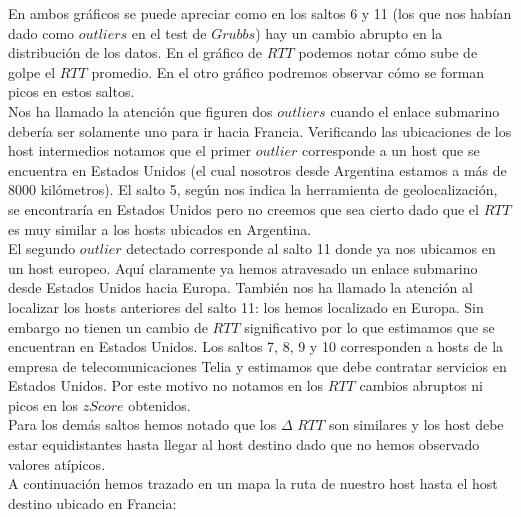 En ambos gráficos se puede apreciar como en los saltos 6 y 11 (los que nos habían dado como $outliers$ en el test de $Grubbs$) hay un cambio abrupto 
en la distribución de los datos. En el gráfico de $RTT$ podemos notar cómo sube de golpe el $RTT$ promedio. En el otro gráfico podremos observar cómo 
se forman picos en estos saltos.\\

Nos ha llamado la atención que figuren dos $outliers$ cuando el enlace submarino debería ser solamente uno para ir hacia Francia. 
Verificando las ubicaciones de los host intermedios notamos que el primer $outlier$ corresponde a un host que se encuentra en Estados Unidos 
(el cual nosotros desde Argentina estamos a más de 8000 kilómetros). El salto 5, según nos indica la herramienta de geolocalización, se encontraría
en Estados Unidos pero no creemos que sea cierto dado que el $RTT$ es muy similar a los hosts ubicados en Argentina.\\

El segundo $outlier$ detectado corresponde al salto 11 donde ya nos ubicamos en un host europeo. Aquí claramente ya hemos atravesado un 
enlace submarino desde Estados Unidos hacia Europa. También nos ha llamado la atención al localizar los hosts anteriores del salto 11: los hemos 
localizado en Europa. Sin embargo no tienen un cambio de $RTT$ significativo por lo que estimamos que se encuentran en Estados Unidos. Los saltos 7, 8, 9 y 10
corresponden a hosts de la empresa de telecomunicaciones Telia y estimamos que debe contratar servicios en Estados Unidos. Por este motivo no notamos 
en los $RTT$ cambios abruptos ni picos en los $zScore$ obtenidos.\\

Para los demás saltos hemos notado que los $\Delta$ $RTT$ son similares y los host debe estar equidistantes hasta llegar al host destino dado que no 
hemos observado valores atípicos.\\

A continuación hemos trazado en un mapa la ruta de nuestro host hasta el host destino ubicado en Francia:

